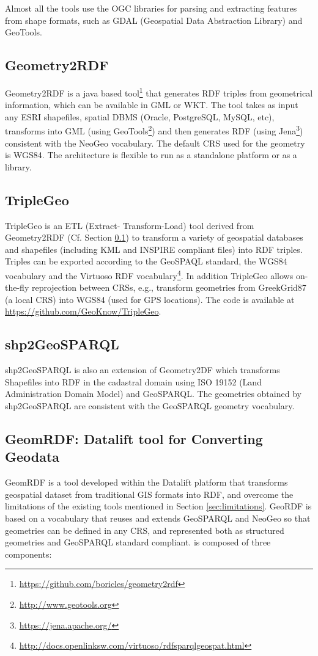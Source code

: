 Almost all the tools use the OGC libraries for parsing and extracting features from shape formats, such as GDAL (Geospatial Data Abstraction Library) and GeoTools.

\subsection{Geometry2RDF} \label{sec:geo2rdf}
Geometry2RDF \cite{deLeon2010} is a java based tool\footnote{\url{https://github.com/boricles/geometry2rdf}} that generates RDF triples from geometrical information, which can be available in GML or WKT. The tool takes as input any ESRI shapefiles, spatial DBMS (Oracle,  PostgreSQL, MySQL, etc), transforms into GML (using GeoTools\footnote{\url{http://www.geotools.org}}) and then generates RDF (using Jena\footnote{\url{https://jena.apache.org/}}) consistent with the NeoGeo vocabulary. The default CRS used for the geometry is WGS84. The architecture is flexible to run as a standalone platform or as a library. 

\subsection{TripleGeo}
TripleGeo \cite{triplegeo2014} is an ETL (Extract- Transform-Load) tool derived from Geometry2RDF (Cf. Section \ref{sec:geo2rdf}) to transform a variety of geospatial databases and shapefiles (including KML and INSPIRE compliant files) into RDF triples. Triples can be exported according to the GeoSPAQL standard, the WGS84 vocabulary and the Virtuoso RDF vocabulary\footnote{\url{http://docs.openlinksw.com/virtuoso/rdfsparqlgeospat.html}}. In addition TripleGeo allows on-the-fly reprojection between CRSs, e.g., transform geometries from GreekGrid87 (a local CRS) into WGS84 (used for GPS locations). The code is available at \url{https://github.com/GeoKnow/TripleGeo}.

\subsection{shp2GeoSPARQL}
shp2GeoSPARQL \cite{saavedra14} is also an extension of Geometry2DF which transforms Shapefiles into RDF in the cadastral domain using ISO 19152 \cite{iso2012} (Land Administration Domain Model) and GeoSPARQL. The geometries obtained by shp2GeoSPARQL are consistent with the GeoSPARQL geometry vocabulary.






\subsection{GeomRDF: Datalift tool for Converting Geodata}
\label{sec:geomRDF}
GeomRDF \cite{hamdi14} is a tool developed within the Datalift platform that transforms geospatial dataset from traditional GIS formats into RDF, and overcome the limitations of the existing tools mentioned in Section \ref{sec:limitations}. GeoRDF is based on a vocabulary that reuses and extends GeoSPARQL and NeoGeo so that geometries can be defined in any CRS, and represented both as structured geometries and GeoSPARQL standard compliant. \geom is composed of three components: 

